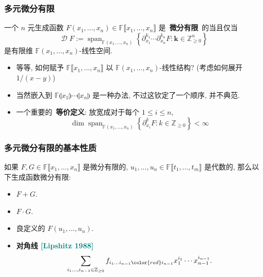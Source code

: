 \documentclass{ctexbeamer}
\newcommand{\cnote}[2][\footnotesize]{\textcolor{teal}{#1[#2]}}
\newcommand{\bbF}{\mathbb F}
\newcommand{\bbZ}{\mathbb Z}
\DeclareMathOperator{\Span}{span}
\DeclareMathOperator{\calD}{\mathcal D}
\begin{document}
\begin{frame}
  \frametitle{多元微分有限}

  \begin{definition}[多元微分有限]
    一个 $n$ 元生成函数 $F(x_1,\dots,x_n) \in \bbF \llbracket x_1,\dots,x_n \rrbracket$ 是~\textbf{微分有限}~的当且仅当
    \begin{equation}
      \calD F := \Span_{\bbF(x_1,\dots,x_n)} \left\{ \partial_{x_1}^{k_1}\cdots \partial_{x_n}^{k_n} F : \bm{k} \in \bbZ_{\geq 0}^n \right\}
    \end{equation}
    是有限维 $\bbF(x_1,\dots,x_n)$-线性空间.
  \end{definition}
  \begin{itemize}
    \item 等等, 如何赋予 $\bbF \llbracket x_1,\dots,x_n \rrbracket$ 以 $\bbF(x_1,\dots,x_n)$-线性结构?
    (考虑如何展开 $1 / (x - y)$)
    \item 当然嵌入到 $\bbF \llparenthesis x_1 \rrparenthesis\cdots \llparenthesis x_n \rrparenthesis$
    是一种办法, 不过这钦定了一个顺序, 并不典范.
    \item 一个重要的~\textbf{等价定义}: 放宽成对于每个 $1\leq i\leq n$,
    \begin{equation}
      \dim \Span_{\bbF(x_1,\dots,x_n)} \left\{ \partial_{x_i}^k F : k \in \bbZ_{\geq 0} \right\} < \infty
    \end{equation}
  \end{itemize}

\end{frame}

\begin{frame}
  \frametitle{多元微分有限的基本性质}

  \begin{theorem}
    如果 $F, G \in \bbF \llbracket x_1,\dots,x_n \rrbracket$ 是微分有限的, $u_1,\dots,u_n \in \bbF \llbracket t_1,\dots,t_m \rrbracket$ 是代数的,
    那么以下生成函数微分有限:
    \begin{itemize}
      \item $F + G$.
      \item $F\cdot G$.
      \item 良定义的 $F(u_1,\dots,u_n)$.
      \item<2-> \textbf{对角线 \cnote{Lipshitz 1988}}
      \begin{equation}
        \sum_{i_1\dots, i_{n-1} \in \bbZ_{\geq 0}} f_{i_1 \dots i_{n-1} \color{red} i_{n-1}} x_1^{i_1} \cdots x_{n-1}^{i_{n-1}}.
      \end{equation}
    \end{itemize}
  \end{theorem}

\end{frame}
\end{document}
